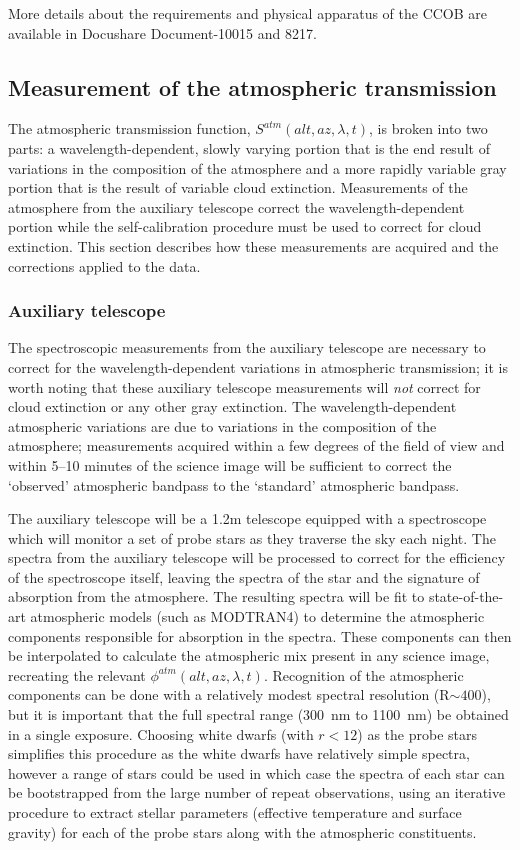 \documentclass[12pt,preprint]{aastex}
\begin{document}
More details about the requirements and physical apparatus of the CCOB
are available in Docushare Document-10015 and 8217.

\subsection{Measurement of the atmospheric transmission} 

The atmospheric transmission function, $S^{atm}(alt,az,\lambda,t)$, is
broken into two parts: a wavelength-dependent, slowly varying portion
that is the end result of variations in the composition of the
atmosphere and a more rapidly variable gray portion that is the result
of variable cloud extinction. Measurements of the atmosphere from the
auxiliary telescope correct the wavelength-dependent portion while the
self-calibration procedure must be used to correct for cloud
extinction. This section describes how these measurements are acquired
and the corrections applied to the data.

\subsubsection{Auxiliary telescope}
\label{sec:auxtele}

The spectroscopic measurements from the auxiliary telescope are
necessary to correct for the wavelength-dependent variations in
atmospheric transmission; it is worth noting that these auxiliary
telescope measurements will {\it not} correct for cloud extinction or
any other gray extinction. The wavelength-dependent atmospheric
variations are due to variations in the composition of the atmosphere;
measurements acquired within a few degrees of the field of view and
within 5--10 minutes of the science image will be sufficient to
correct the `observed' atmospheric bandpass to the `standard'
atmospheric bandpass.

The auxiliary telescope will be a 1.2m telescope equipped with a
spectroscope which will monitor a set of probe stars as they traverse
the sky each night. The spectra from the auxiliary telescope will be
processed to correct for the efficiency of the spectroscope itself,
leaving the spectra of the star and the signature of absorption from
the atmosphere. The resulting spectra will be fit to state-of-the-art
atmospheric models (such as MODTRAN4) to determine the atmospheric
components responsible for absorption in the spectra. These components
can then be interpolated to calculate the atmospheric mix present in
any science image, recreating the relevant
$\phi^{atm}(alt,az,\lambda,t)$. Recognition of the atmospheric components
can be done with a relatively modest spectral resolution (R$\sim400$),
but it is important that the full spectral range (300~nm to 1100~nm)
be obtained in a single exposure. Choosing white dwarfs (with $r<12$)
as the probe stars simplifies this procedure as the white dwarfs have
relatively simple spectra, however a range of stars could be used in
which case the spectra of each star can be bootstrapped from the large
number of repeat observations, using an iterative procedure to extract
stellar parameters (effective temperature and surface gravity) for
each of the probe stars along with the atmospheric constituents. 
\end{document}
